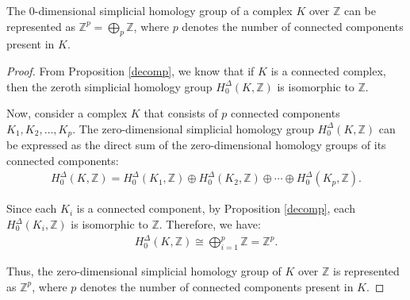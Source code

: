 \begin{corollary}
\label{directsum0hom}
The $0$-dimensional simplicial homology group of a complex \( K \) over \( \mathbb{Z} \) can be represented as \( \mathbb{Z}^{p} = \bigoplus_{p} \mathbb{Z} \), where \( p \) denotes the number of connected components present in \( K \).
\end{corollary}

\begin{proof}
From Proposition \ref{decomp}, we know that if \( K \) is a connected complex, then the zeroth simplicial homology group \( H^{\Delta}_{0}(K, \mathbb{Z}) \) is isomorphic to \( \mathbb{Z} \).

Now, consider a complex \( K \) that consists of \( p \) connected components \( K_1, K_2, \ldots, K_p \). The zero-dimensional simplicial homology group \( H^{\Delta}_{0}(K, \mathbb{Z}) \) can be expressed as the direct sum of the zero-dimensional homology groups of its connected components:
\begin{align}
H^{\Delta}_{0}(K, \mathbb{Z}) = H^{\Delta}_{0}(K_1, \mathbb{Z}) \oplus H^{\Delta}_{0}(K_2, \mathbb{Z}) \oplus \cdots \oplus H^{\Delta}_{0}(K_p, \mathbb{Z}).
\end{align}

Since each \( K_i \) is a connected component, by Proposition \ref{decomp}, each \( H^{\Delta}_{0}(K_i, \mathbb{Z}) \) is isomorphic to \( \mathbb{Z} \). Therefore, we have:
\begin{align}
H^{\Delta}_{0}(K, \mathbb{Z}) \cong \bigoplus_{i=1}^p \mathbb{Z} = \mathbb{Z}^{p}.
\end{align}

Thus, the zero-dimensional simplicial homology group of \( K \) over \( \mathbb{Z} \) is represented as \( \mathbb{Z}^{p} \), where \( p \) denotes the number of connected components present in \( K \).
\end{proof}


